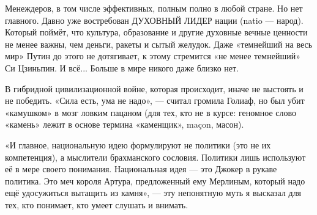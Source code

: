 Менеждеров, в том числе эффективных, полным полно в любой стране. Но нет
главного. Давно уже востребован ДУХОВНЫЙ ЛИДЕР нации (natio — народ). Который
поймёт, что культура, образование и другие духовные вечные ценности не менее
важны, чем деньги, ракеты и сытый желудок. Даже «темнейший на весь мир» Путин
до этого не дотягивает, к этому стремится «не менее темнейший» Си Цзиньпин. И
всё... Больше в мире никого даже близко нет.

В гибридной цивилизационной войне, которая происходит, иначе не выстоять и не
победить. «Сила есть, ума не надо», — считал громила Голиаф, но был убит
«камушком» в мозг ловким пацаном (для тех, кто не в курсе: геномное слово
«камень» лежит в основе термина «каменщик», maçon, масон).

«И главное, национальную идею формулируют не политики (это не их компетенция),
а мыслители брахманского сословия. Политики лишь используют её в мере своего
понимания. Национальная идея — это Джокер в рукаве политика. Это меч короля
Артура, предложенный ему Мерлиным, который надо ещё удосужиться вытащить из
камня», — эту непонятную муть я высказал для тех, кто понимает, кто умеет
слушать и внимать.


